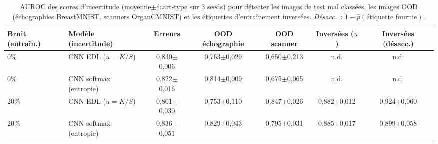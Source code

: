 \begin{table}[t]
\centering
\small
\caption{AUROC des scores d'incertitude (moyenne$\pm$écart-type sur 3 seeds) pour détecter les images de test mal classées, les images OOD (échographies BreastMNIST, scanners OrganCMNIST) et les étiquettes d'entraînement inversées. \emph{Désacc.}~: $1-\hat p(\text{étiquette fournie})$.}
\label{tab:uncertainty}
\begin{adjustbox}{max width=\textwidth}
\begin{tabular}{llccccc}
\toprule
Bruit (entraîn.) & Modèle (incertitude) & Erreurs & OOD échographie & OOD scanner & Inversées ($u$) & Inversées (désacc.) \\
\midrule
0\% & CNN EDL ($u=K/S$) & 0,830$\pm$0,006 & 0,763$\pm$0,029 & 0,650$\pm$0,213 & n.d. & n.d. \\
0\% & CNN softmax (entropie) & 0,822$\pm$0,016 & 0,814$\pm$0,009 & 0,675$\pm$0,065 & n.d. & n.d. \\
20\% & CNN EDL ($u=K/S$) & 0,801$\pm$0,030 & 0,753$\pm$0,110 & 0,847$\pm$0,026 & 0,882$\pm$0,012 & 0,924$\pm$0,060 \\
20\% & CNN softmax (entropie) & 0,836$\pm$0,051 & 0,829$\pm$0,043 & 0,795$\pm$0,031 & 0,885$\pm$0,017 & 0,899$\pm$0,058 \\
\bottomrule
\end{tabular}
\end{adjustbox}
\end{table}
